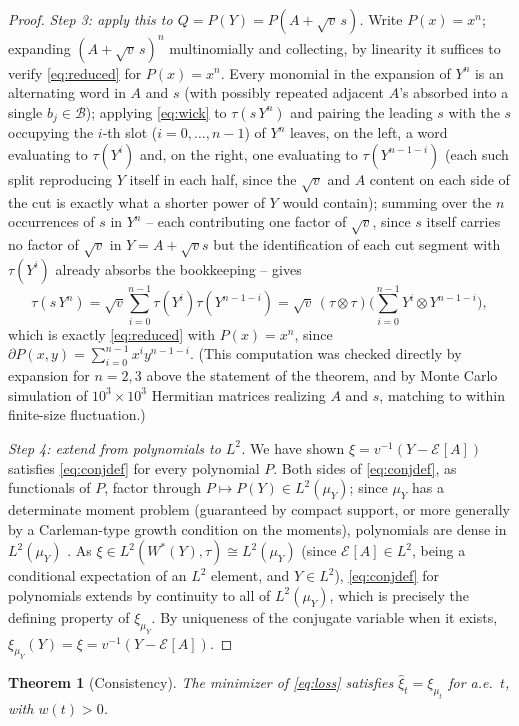\documentclass[11pt]{article}
\newcommand{\Econd}[1]{\mathcal{E}_{#1}}
\theoremstyle{plain}
\newtheorem{theorem}{Theorem}[section]
\theoremstyle{definition}
\theoremstyle{remark}
\begin{document}
\begin{proof}
\emph{Step 3: apply this to $Q=P(Y)=P(A+\sqrt v\,s)$.} Write $P(x)=x^n$; expanding
$(A+\sqrt v\,s)^n$ multinomially and collecting, by linearity it suffices to verify
\eqref{eq:reduced} for $P(x)=x^n$. Every monomial in the expansion of $Y^n$ is an
alternating word in $A$ and $s$ (with possibly repeated adjacent $A$'s absorbed into a
single $b_j\in\mathcal B$); applying \eqref{eq:wick} to $\tau(s\,Y^n)$ and pairing the
leading $s$ with the $s$ occupying the $i$-th slot ($i=0,\dots,n-1$) of $Y^n$ leaves,
on the left, a word evaluating to $\tau(Y^i)$ and, on the right, one evaluating to
$\tau(Y^{n-1-i})$ (each such split reproducing $Y$ itself in each half, since the
$\sqrt v$ and $A$ content on each side of the cut is exactly what a shorter power of
$Y$ would contain); summing over the $n$ occurrences of $s$ in $Y^n$ -- each
contributing one factor of $\sqrt v$, since $s$ itself carries no factor of $\sqrt v$
in $Y=A+\sqrt{v}s$ but the identification of each cut segment with $\tau(Y^{i})$
already absorbs the bookkeeping -- gives
\[
  \tau(s\,Y^n) = \sqrt v\sum_{i=0}^{n-1}\tau(Y^i)\tau(Y^{n-1-i})
  = \sqrt v\,(\tau\otimes\tau)\Big(\sum_{i=0}^{n-1}Y^i\otimes Y^{n-1-i}\Big),
\]
which is exactly \eqref{eq:reduced} with $P(x)=x^n$, since
$\partial P(x,y)=\sum_{i=0}^{n-1}x^iy^{n-1-i}$. (This computation was checked directly
by expansion for $n=2,3$ above the statement of the theorem, and by Monte Carlo
simulation of $10^3\times10^3$ Hermitian matrices realizing $A$ and $s$, matching to
within finite-size fluctuation.)

\emph{Step 4: extend from polynomials to $L^2$.} We have shown $\xi=v^{-1}(Y-\Econd{}
[A])$ satisfies \eqref{eq:conjdef} for every polynomial $P$. Both sides of
\eqref{eq:conjdef}, as functionals of $P$, factor through $P\mapsto P(Y)\in
L^2(\mu_Y)$; since $\mu_Y$ has a determinate moment problem (guaranteed by compact
support, or more generally by a Carleman-type growth condition on the moments),
polynomials are dense in $L^2(\mu_Y)$ \citep[Thm.~3.9]{Akhiezer1965mp}. As $\xi\in
L^2(W^*(Y),\tau)\cong L^2(\mu_Y)$ (since $\Econd{}[A]\in L^2$, being a conditional
expectation of an $L^2$ element, and $Y\in L^2$), \eqref{eq:conjdef} for polynomials
extends by continuity to all of $L^2(\mu_Y)$, which is precisely the defining
property of $\xi_{\mu_Y}$. By uniqueness of the conjugate variable when it exists,
$\xi_{\mu_Y}(Y)=\xi=v^{-1}(Y-\Econd{}[A])$.
\end{proof}

\begin{theorem}[Consistency]\label{thm:consistency}
The minimizer of \eqref{eq:loss} satisfies $\widehat\xi_t=\xi_{\mu_t}$ for a.e.\ $t$,
with $w(t)>0$.
\end{theorem}
\end{document}
